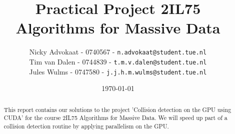 \documentclass[a4paper,twoside,11pt]{article}
\title{\vspace{-\baselineskip}\sffamily\bfseries Practical Project 2IL75 \\ Algorithms for Massive Data }
\author{
Nicky Advokaat - 0740567 - {\tt n.advokaat@student.tue.nl} \\
Tim van Dalen - 0744839 - {\tt t.m.v.dalen@student.tue.nl}\\
Jules Wulms - 0747580 - {\tt j.j.h.m.wulms@student.tue.nl}\\
}
\date{\today}
\numberwithin{equation}{section}
\begin{document}
\maketitle
\thispagestyle{empty}
\begin{abstract}
This report contains our solutions to the project  'Collision detection on the GPU using CUDA'  for the course 2IL75 Algorithms for Massive Data. We will speed up part of a collision detection routine by applying parallelism on the GPU.
\end{abstract}












\end{document}
